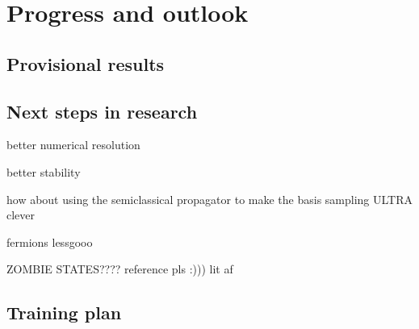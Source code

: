 \documentclass[12pt]{article}
\begin{document}
	
	
	\section{Progress and outlook}
	
	
	
	\subsection{Provisional results}
	
	\subsection{Next steps in research}
	better numerical resolution
	
	better stability
	
	how about using the semiclassical propagator to make the basis sampling ULTRA clever
	
	fermions lessgooo
	
	ZOMBIE STATES???? reference pls :))) lit af
	
	\subsection{Training plan}
	
	
	
\end{document}
